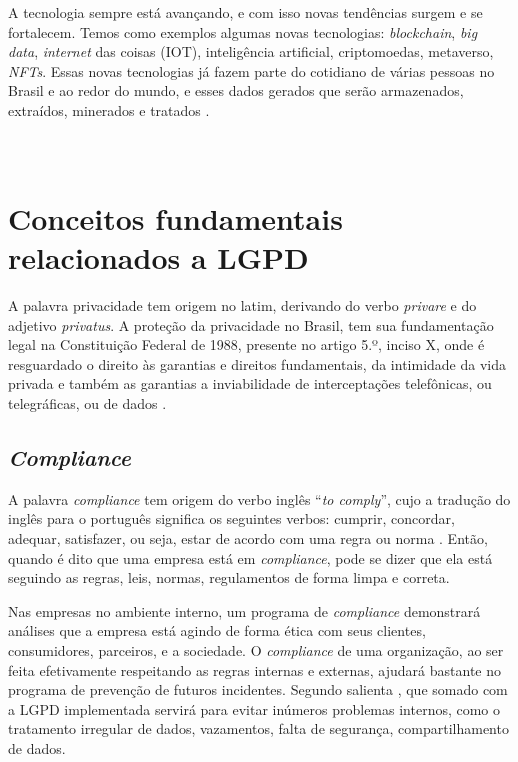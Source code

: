 \documentclass[
	12pt,				%
	openright,			%
	oneside,			%
	a4paper,			%
	english,			%
	french,				%
	spanish,			%
	brazil,				%
	]{abntex2}
\begin{document}
A tecnologia sempre está avançando, e com isso novas tendências surgem e se fortalecem. Temos como exemplos algumas novas tecnologias: \textit{blockchain}, \textit{big data}, \textit{internet} das coisas (IOT), inteligência artificial, criptomoedas, metaverso, \textit{NFTs}. Essas novas tecnologias já fazem parte do cotidiano de várias pessoas no Brasil e ao redor do mundo, e esses dados gerados que serão armazenados, extraídos, minerados e tratados \cite{02-01-Vainzof2020}.
\\
\\
\\

\section{Conceitos fundamentais relacionados a LGPD }
A palavra privacidade tem origem no latim, derivando do verbo \textit{privare} e do adjetivo \textit{privatus}. A proteção da privacidade no Brasil, tem sua fundamentação legal na Constituição Federal de 1988, presente no artigo 5.º, inciso X, onde é resguardado o direito às garantias e direitos fundamentais, da intimidade da vida privada e também as garantias a inviabilidade de interceptações telefônicas, ou telegráficas, ou de dados \cite{Doneda2020}.


\subsection{\textit{Compliance}}

A palavra \textit{compliance} tem origem do verbo inglês “\textit{to comply}”, cujo a tradução do inglês para o português significa os seguintes verbos: cumprir, concordar, adequar, satisfazer, ou seja, estar de acordo com uma regra ou norma \cite{Lamboy2018}. Então, quando é dito que uma empresa está em \textit{compliance}, pode se dizer que ela está seguindo as regras, leis, normas, regulamentos de forma limpa e correta.

Nas empresas no ambiente interno, um programa de \textit{compliance} demonstrará análises que a empresa está agindo de forma ética com seus clientes, consumidores, parceiros, e a sociedade. O \textit{compliance} de uma organização, ao ser feita efetivamente respeitando as regras internas e externas, ajudará bastante no programa de prevenção de futuros incidentes. Segundo salienta , que somado com a LGPD implementada servirá para evitar inúmeros problemas internos, como o tratamento irregular de dados, vazamentos, falta de segurança, compartilhamento de dados.
\end{document}
